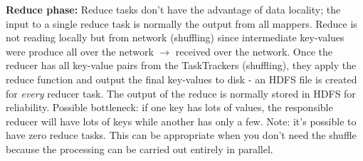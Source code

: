 \documentclass[11pt,oneside,a4paper]{article}
\begin{document}
\textbf{Reduce phase:} Reduce tasks don’t have the advantage of data locality; the input to a single reduce task is normally the output from all mappers. Reduce is not reading locally but from network (shuffling) since intermediate key-values were produce all over the network $\rightarrow$ received over the network. Once the reducer has all key-value pairs from the TaskTrackers (shuffling), they apply the reduce function and output the final key-values to disk - an HDFS file is created for \textit{every} reducer task. The output of the reduce is normally stored in HDFS for reliability. Possible bottleneck: if one key has lots of values, the responsible reducer will have lots of keys while another has only a few. Note: it’s possible to have zero reduce tasks. This can be appropriate when you don’t need the shuffle because the processing can be carried out entirely in parallel.
\end{document}
